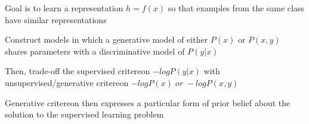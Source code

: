 \documentclass[11pt]{article}
\begin{document}
    Goal is to learn a representation \(h = f(x)\) so that examples from the
same class have similar representations

    Construct models in which a generative model of either \(P(x)\) or
\(P(x,y)\) shares parameters with a discriminative model of \(P(y | x)\)

    Then, trade-off the supervised critereon \(- log P(y | x)\) with
unsupervised/generative critereon \(-log P(x)\; or\; -logP(x,y)\)

    Generative critereon then expresses a particular form of prior belief
about the solution to the supervised learning problem

    


    
    
    
    
\end{document}
